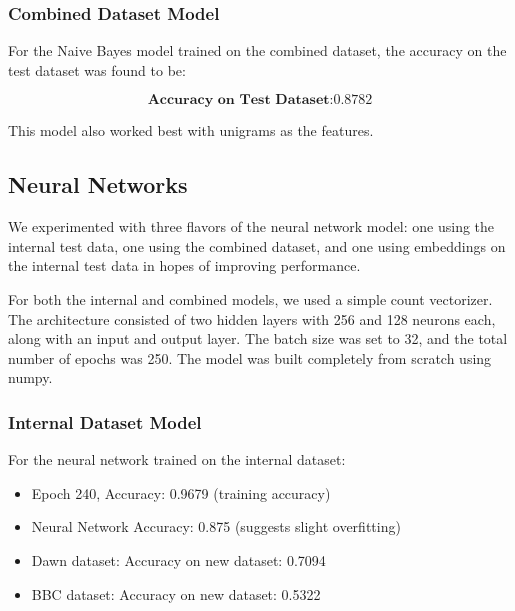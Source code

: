\documentclass[sigconf]{acmart}
\begin{document}
\subsubsection{Combined Dataset Model}

For the Naive Bayes model trained on the combined dataset, the accuracy on the test dataset was found to be:

\[
\textbf{Accuracy on Test Dataset:} 0.8782
\]

This model also worked best with unigrams as the features.


\subsection{Neural Networks}

We experimented with three flavors of the neural network model: one using the internal test data, one using the combined dataset, and one using embeddings on the internal test data in hopes of improving performance.

For both the internal and combined models, we used a simple count vectorizer. The architecture consisted of two hidden layers with 256 and 128 neurons each, along with an input and output layer. The batch size was set to 32, and the total number of epochs was 250. The model was built completely from scratch using numpy.

\subsubsection{Internal Dataset Model}

For the neural network trained on the internal dataset:

\begin{itemize}
    \item Epoch 240, Accuracy: 0.9679 (training accuracy)
    \item Neural Network Accuracy: 0.875 (suggests slight overfitting)
    \item Dawn dataset: Accuracy on new dataset: 0.7094
    \item BBC dataset: Accuracy on new dataset: 0.5322
\end{itemize}
\end{document}
